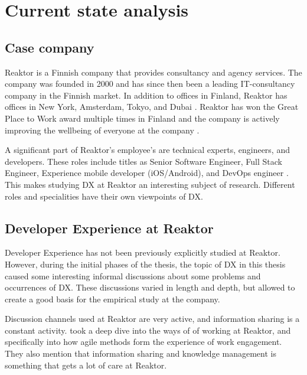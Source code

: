 \documentclass[english, 12pt, a4paper, sci, utf8, a-1b, online]{aaltothesis}
\begin{document}
\clearpage
\section{Current state analysis}

\subsection{Case company}

Reaktor is a Finnish company that provides consultancy and agency services. The company was founded in 2000 and has since then been a leading IT-consultancy company in the Finnish market. In addition to offices in Finland, Reaktor has offices in New York, Amsterdam, Tokyo, and Dubai \parencite{reaktor-home}. Reaktor has won the Great Place to Work award multiple times in Finland \parencite{reaktor-gptw} and the company is actively improving the wellbeing of everyone at the company \parencite{talouselama-reaktor}.

A significant part of Reaktor's employee's are technical experts, engineers, and developers. These roles include titles as Senior Software Engineer, Full Stack Engineer, Experience mobile developer (iOS/Android), and DevOps engineer \parencite{reaktor-careers}. This makes studying DX at Reaktor an interesting subject of research. Different roles and specialities have their own viewpoints of DX.

\subsection{Developer Experience at Reaktor}

Developer Experience has not been previously explicitly studied at Reaktor. However, during the initial phases of the thesis, the topic of DX in this thesis caused some interesting informal discussions about some problems and occurrences of DX. These discussions varied in length and depth, but allowed to create a good basis for the empirical study at the company.

Discussion channels used at Reaktor are very active, and information sharing is a constant activity. \textcite{thesis-nelli-vilkko} took a deep dive into the ways of of working at Reaktor, and specifically into how agile methods form the experience of work engagement. They also mention that information sharing and knowledge management is something that gets a lot of care at Reaktor.
\end{document}
